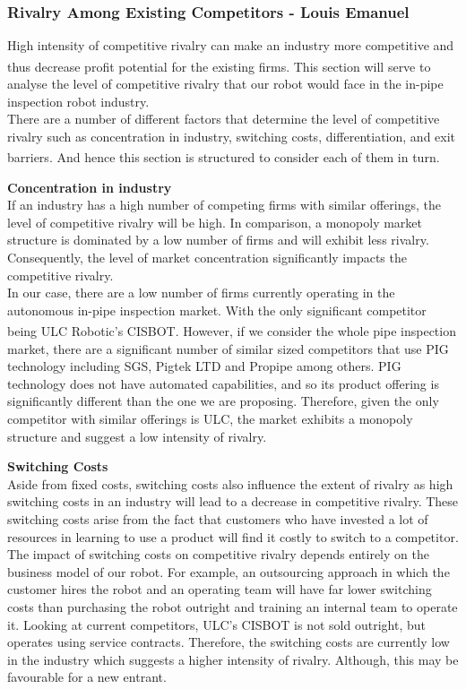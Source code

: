\documentclass[11pt]{article}		%
\newcommand{\supercite}[1]{\textsuperscript{\cite{#1}}}		%
\begin{document}
            \subsubsection{Rivalry Among Existing Competitors - Louis Emanuel}
				High intensity of competitive rivalry can make an industry more competitive and thus decrease profit potential for the existing firms\supercite{porter2008five}. This section will serve to analyse the level of competitive rivalry that our robot would face in the in-pipe inspection robot industry. \\
		        \hspace*{3ex}There are a number of different factors that determine the level of competitive rivalry such as concentration in industry, switching costs, differentiation, and exit barriers\supercite{rivalryfactorsCI}. And hence this section is structured to consider each of them in turn. 
		        
		        \textbf{Concentration in industry}\\
		        If an industry has a high number of competing firms with similar offerings, the level of competitive rivalry will be high. In comparison, a monopoly market structure is dominated by a low number of firms and will exhibit less rivalry. Consequently, the level of market concentration significantly impacts the competitive rivalry.\\
		        \hspace*{3ex}In our case, there are a low number of firms currently operating in the autonomous in-pipe inspection market. With the only significant competitor being ULC Robotic’s CISBOT\supercite{cisbotbeast}. However, if we consider the whole pipe inspection market, there are a significant number of similar sized competitors that use PIG technology including SGS, Pigtek LTD and Propipe among others. PIG technology does not have automated capabilities, and so its product offering is significantly different than the one we are proposing. Therefore, given the only competitor with similar offerings is ULC, the market exhibits a monopoly structure and suggest a low intensity of rivalry.
		        
		        \textbf{Switching Costs}\\
		        Aside from fixed costs, switching costs also influence the extent of rivalry as high switching costs in an industry will lead to a decrease in competitive rivalry. These switching costs arise from the fact that customers who have invested a lot of resources in learning to use a product will find it costly to switch to a competitor. \\
		        \hspace*{3ex}The impact of switching costs on competitive rivalry depends entirely on the business model of our robot. For example, an outsourcing approach in which the customer hires the robot and an operating team will have far lower switching costs than purchasing the robot outright and training an internal team to operate it. Looking at current competitors, ULC’s CISBOT is not sold outright, but operates using service contracts. Therefore, the switching costs are currently low in the industry which suggests a higher intensity of rivalry. Although, this may be favourable for a new entrant. 
		
\end{document}
